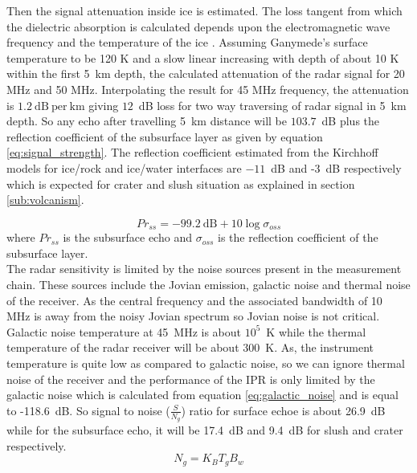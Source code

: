 Then the signal attenuation inside ice is estimated. The loss tangent from which the dielectric absorption is calculated depends upon the electromagnetic wave frequency and the temperature of the ice \cite{MIMOSA}. Assuming Ganymede's surface temperature to be 120 K and a slow linear increasing with depth of about 10 K within the first 5~km depth\cite{Gany_SRS}, the calculated attenuation of the radar signal for 20 MHz and 50 MHz. Interpolating the result for 45 MHz frequency, the attenuation is $1.2 \mathrm{~dB~per~km}$ giving $12$~dB loss for two way traversing of radar signal in 5~km depth. So any echo after travelling 5~km distance will be $103.7$~dB plus the reflection coefficient of the subsurface layer as given by equation \ref{eq:signal_strength}. The reflection coefficient estimated from the Kirchhoff models for ice/rock and ice/water interfaces are $-11$~dB and -3~dB respectively which is expected for  crater and slush situation as explained in section \ref{sub:volcanism}.

%
\begin{equation}
Pr_{ss} = -99.2 \mathrm{~dB} + 10 \log \sigma_{oss}
\label{eq:signal_strength}
\end{equation}
where $Pr_{ss}$ is the subsurface echo and $\sigma_{oss}$ is the reflection coefficient of the subsurface layer.\\
The radar sensitivity is limited by the noise sources present in the measurement chain. These sources include the Jovian emission, galactic noise and thermal noise of the receiver.  As the central frequency and the associated bandwidth of 10~ MHz is away from the noisy Jovian spectrum so Jovian noise is not critical. Galactic noise temperature at 45~MHz is about $10^{5}$~K while the thermal temperature of the radar receiver will be about  300~K. As, the instrument temperature is quite low as compared to galactic noise, so we can ignore thermal noise of the receiver and the performance of the \ac{IPR} is only limited by the galactic noise which is calculated from equation \ref{eq:galactic_noise} and is equal to -118.6~dB. So signal to noise ($\frac{S}{N_{g}}$) ratio for surface echoe is about 26.9~dB while for the subsurface echo, it will be 17.4~dB and 9.4~dB for slush and crater respectively.
\begin{equation}
N_{g} = K_{B}T_{g}B_{w}
\label{eq:galactic_noise}
\end{equation}
\\


